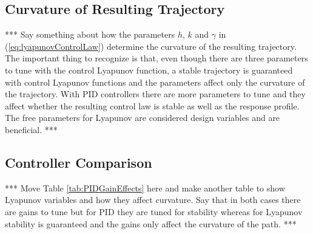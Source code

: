\subsection{Curvature of Resulting Trajectory}
\label{sec:trajectoryCurvature}
*** Say something about how the parameters $h$, $k$ and $\gamma$ in (\ref{eq:lyapunovControlLaw}) determine the curvature of the resulting trajectory. The important thing to recognize is that, even though there are three parameters to tune with the control Lyapunov function, a stable trajectory is guaranteed with control Lyapunov functions and the parameters affect only the curvature of the trajectory. With PID controllers there are more parameters to tune and they affect whether the resulting control law is stable as well as the response profile. The free parameters for Lyapunov are considered design variables and are beneficial. ***

\subsection{Controller Comparison}
\label{sec:controllerComparison}
*** Move Table \ref{tab:PIDGainEffects} here and make another table to show Lyapunov variables and how they affect curvature. Say that in both cases there are gains to tune but for PID they are tuned for stability whereas for Lyapunov stability is guaranteed and the gains only affect the curvature of the path. ***
